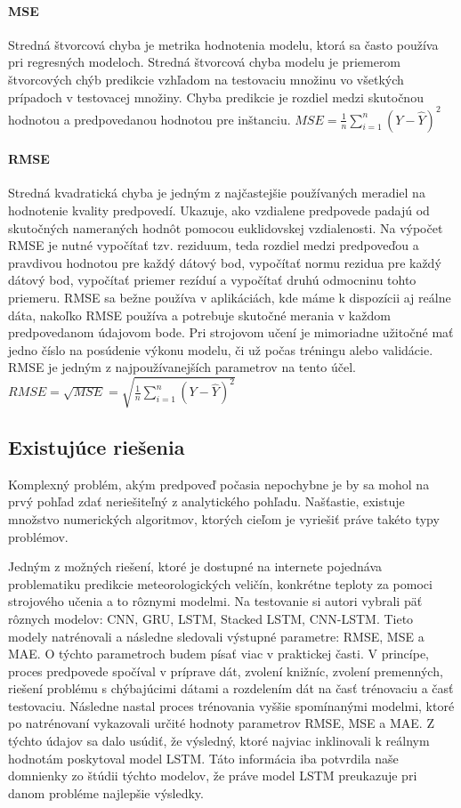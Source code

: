 \paragraph{MSE} Stredná štvorcová chyba je metrika hodnotenia modelu, ktorá sa často používa pri regresných modeloch. Stredná štvorcová chyba modelu je priemerom štvorcových chýb predikcie vzhľadom na testovaciu množinu vo všetkých prípadoch v testovacej množiny. Chyba predikcie je rozdiel medzi skutočnou hodnotou a predpovedanou hodnotou pre inštanciu. \newline
$MSE = {\frac{1}{n}\sum_{i=1}^{n}(Y-\widehat{Y})^{2}}$

\paragraph{RMSE} Stredná kvadratická chyba je jedným z najčastejšie používaných meradiel na hodnotenie kvality predpovedí. Ukazuje, ako vzdialene predpovede padajú od skutočných nameraných hodnôt pomocou euklidovskej vzdialenosti. Na výpočet RMSE je nutné vypočítať tzv. reziduum, teda rozdiel medzi predpoveďou a pravdivou hodnotou pre každý dátový bod, vypočítať normu rezidua pre každý dátový bod, vypočítať priemer rezíduí a vypočítať druhú odmocninu tohto priemeru. RMSE sa bežne používa v aplikáciách, kde máme k dispozícii aj reálne dáta, nakoľko RMSE používa a potrebuje skutočné merania v každom predpovedanom údajovom bode. Pri strojovom učení je mimoriadne užitočné mať jedno číslo na posúdenie výkonu modelu, či už počas tréningu alebo validácie. RMSE je jedným z najpoužívanejších parametrov na tento účel. \newline
$RMSE = \sqrt{MSE} = \sqrt{\frac{1}{n}\sum_{i=1}^{n}(Y-\widehat{Y})^{2}}$

\newpage

\subsection{Existujúce riešenia}
Komplexný problém, akým predpoveď počasia nepochybne je by sa mohol na prvý pohľad zdať neriešiteľný z analytického pohľadu. Našťastie, existuje množstvo numerických algoritmov, ktorých cieľom je vyriešiť práve takéto typy problémov. 

Jedným z možných riešení, ktoré je dostupné na internete pojednáva problematiku predikcie meteorologických veličín, konkrétne teploty za pomoci strojového učenia a to rôznymi modelmi. Na testovanie si autori vybrali päť rôznych modelov: CNN, GRU, LSTM, Stacked LSTM, CNN-LSTM. Tieto modely natrénovali a následne sledovali výstupné parametre: RMSE, MSE a MAE. O týchto parametroch budem písať viac v praktickej časti. V princípe, proces predpovede spočíval v príprave dát, zvolení knižníc, zvolení premenných, riešení problému s chýbajúcimi dátami a rozdelením dát na časť trénovaciu a časť testovaciu. Následne nastal proces trénovania vyššie spomínanými modelmi, ktoré po natrénovaní vykazovali určité hodnoty parametrov RMSE, MSE a MAE. Z týchto údajov sa dalo usúdiť, že výsledný, ktoré najviac inklinovali k reálnym hodnotám poskytoval model LSTM. Táto informácia iba potvrdila naše domnienky zo štúdii týchto modelov, že práve model LSTM preukazuje pri danom probléme najlepšie výsledky. 

